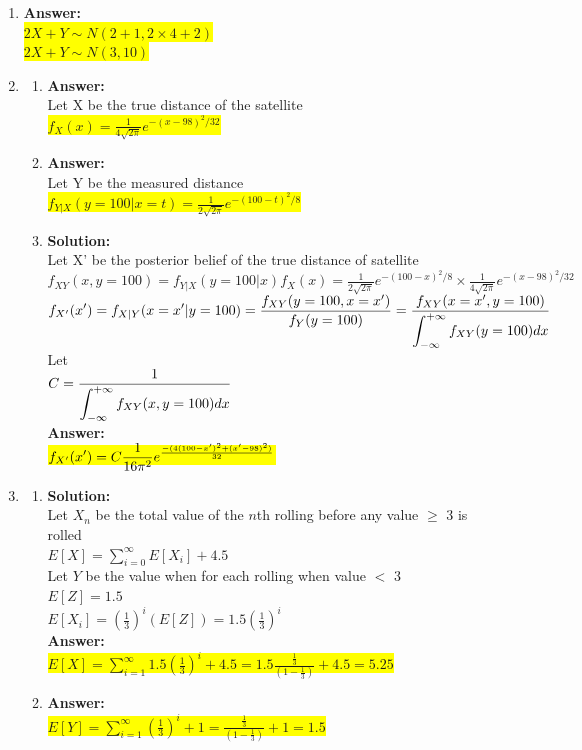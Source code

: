 \documentclass{article}
\newcommand{\myansw}{\textbf{Answer:}\\}
\newcommand{\mysolu}{\textbf{Solution:}\\}
\begin{document}
\begin{enumerate}
	\item 
	\myansw
	\colorbox{yellow}{${2X + Y \sim N(2+1, 2\times 4 + 2)}$}\\
	\colorbox{yellow}{${2X + Y \sim N(3, 10)}$}\\
	\item
	\begin{enumerate}
		\item 
		\myansw
		Let X be the true distance of the satellite\\
		\colorbox{yellow}{$f_X(x) = \frac{1}{4\sqrt{2\pi}}e^{-(x-98)^2/32}$}\\
		\item
		\myansw
		Let Y be the measured distance\\
		\colorbox{yellow}{$f_{Y|X}(y = 100|x = t) = \frac{1}{2\sqrt{2\pi}}e^{-(100-t)^2/8}$}\\
		\item
		\mysolu
		Let X' be the posterior belief of the true distance of satellite\\
		$f_{XY}(x, y = 100) =f_{Y|X}(y = 100|x )f_X(x)=\frac{1}{2\sqrt{2\pi}}e^{-(100-x)^2/8}\times \frac{1}{4\sqrt{2\pi}}e^{-(x-98)^2/32} $\\
		$\mathlarger{f_{X'}(x') = f_{X|Y}(x=x' | y = 100) = \frac{f_{XY}(y = 100, x=x')}{f_Y(y = 100)} = \frac{f_{XY}(x=x',y = 100)}{\mathlarger{\int_{-\infty}^{+\infty}f_{XY}(y = 100)dx}}}$\\
		Let\\
		$\mathlarger{C = \frac{1}{\mathlarger{\int_{-\infty}^{+\infty}f_{XY}(x,y = 100)dx}}}$\\
		\myansw
		\colorbox{yellow}{$\mathlarger{f_{X'}(x') = C\frac{1}{16\pi^2}e^{\frac{-(4(100-x')^2+(x'-98)^2)}{32}}}$}\\
	\end{enumerate}
	\item
	\begin{enumerate}
		\item
		\mysolu
		Let $X_n$ be the total value of the $n$th rolling before any value $\geq$ 3 is rolled\\
		$E[X] = \sum\limits_{i = 0}^{\infty}E[X_i]+4.5$\\
		Let $Y$ be the value when for each rolling when value $<$ 3\\
		$E[Z] = 1.5$\\
		$E[X_i] = (\frac{1}{3})^i(E[Z]) = 1.5(\frac{1}{3})^i$\\
		\myansw
		\colorbox{yellow}{$E[X] = \sum\limits_{i = 1}^{\infty} 1.5(\frac{1}{3})^i+4.5 = 1.5\frac{\frac{1}{3}}{(1-\frac{1}{3})}+4.5=5.25$}\\
		\item
		\myansw
		\colorbox{yellow}{$E[Y] = \sum\limits_{i = 1}^{\infty} (\frac{1}{3})^i+1 = \frac{\frac{1}{3}}{(1-\frac{1}{3})}+1=1.5$}\\		
		

\end{enumerate}
\end{enumerate}
\end{document}
